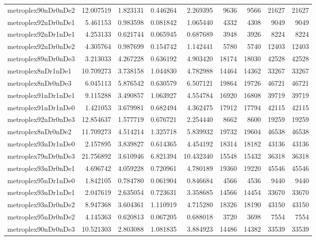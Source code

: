 \begin{longtable}{|l|r|r|r|r|r|r|r|r|}
metroplex90nDr0nDe2 & 12.007519 & 1.823131 & 0.446264 & 2.269395 & 9636 & 9566 & 21627 & 21627 \\
metroplex92nDr0nDe1 & 5.461153 & 0.983598 & 0.081842 & 1.065440 & 4332 & 4308 & 9049 & 9049 \\
metroplex92nDr1nDe1 & 4.253133 & 0.621744 & 0.065945 & 0.687689 & 3948 & 3926 & 8224 & 8224 \\
metroplex92nDr0nDe2 & 4.305764 & 0.987699 & 0.154742 & 1.142441 & 5780 & 5740 & 12403 & 12403 \\
metroplex89nDr0nDe3 & 3.213033 & 4.267228 & 0.636192 & 4.903420 & 18174 & 18030 & 42528 & 42528 \\
metroplex8nDr1nDe1 & 10.709273 & 3.738158 & 1.044830 & 4.782988 & 14464 & 14362 & 33267 & 33267 \\
metroplex8nDr0nDe3 & 6.045113 & 5.876542 & 0.630579 & 6.507121 & 19864 & 19726 & 46721 & 46721 \\
metroplex91nDr1nDe1 & 9.115288 & 3.490857 & 1.063927 & 4.554784 & 16920 & 16808 & 39719 & 39719 \\
metroplex91nDr1nDe0 & 1.421053 & 3.679981 & 0.682494 & 4.362475 & 17912 & 17794 & 42115 & 42115 \\
metroplex92nDr0nDe3 & 12.854637 & 1.577719 & 0.676721 & 2.254440 & 8662 & 8600 & 19259 & 19259 \\
metroplex8nDr0nDe2 & 11.709273 & 4.514214 & 1.325718 & 5.839932 & 19732 & 19604 & 46538 & 46538 \\
metroplex93nDr1nDe0 & 2.157895 & 3.839827 & 0.614365 & 4.454192 & 18314 & 18182 & 43136 & 43136 \\
metroplex79nDr0nDe3 & 21.756892 & 3.610946 & 6.821394 & 10.432340 & 15548 & 15432 & 36318 & 36318 \\
metroplex93nDr0nDe1 & 4.696742 & 4.059228 & 0.720961 & 4.780189 & 19360 & 19220 & 45546 & 45546 \\
metroplex95nDr1nDe0 & 1.842105 & 0.784780 & 0.061904 & 0.846684 & 4566 & 4536 & 9440 & 9440 \\
metroplex93nDr1nDe1 & 2.047619 & 2.635054 & 0.723631 & 3.358685 & 14566 & 14454 & 33670 & 33670 \\
metroplex93nDr0nDe2 & 8.947368 & 3.604361 & 1.110919 & 4.715280 & 18326 & 18190 & 43150 & 43150 \\
metroplex95nDr0nDe2 & 4.145363 & 0.620813 & 0.067205 & 0.688018 & 3720 & 3698 & 7554 & 7554 \\
metroplex90nDr0nDe3 & 10.521303 & 2.803088 & 1.081835 & 3.884923 & 14486 & 14382 & 33539 & 33539 \\

\end{longtable}
